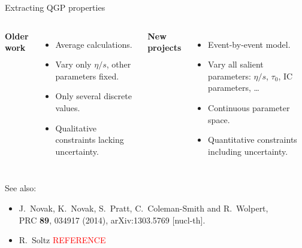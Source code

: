 \documentclass{beamer}
\begin{document}
\begin{frame}{Extracting QGP properties}
  \vspace{1em}
  \begin{columns}
    \begin{center}
      \bf Older work
    \end{center}
    \begin{itemize}
      \item Average calculations.
        \sms
      \item Vary only $\eta/s$, other parameters fixed.
        \sms
      \item Only several discrete values.
        \sms
      \item Qualitative constraints lacking uncertainty.
    \end{itemize}

    \begin{center}
      \bf New projects
    \end{center}
    \begin{itemize}
      \item Event-by-event model.
        \sms
      \item Vary all salient parameters:  $\eta/s$, $\tau_0$, IC parameters, \ldots
        \sms
      \item Continuous parameter space.
        \sms
      \item Quantitative constraints including uncertainty.
    \end{itemize}
  \end{columns}
  
  \vspace{2em}
  \scriptsize
  See also: \\
  \begin{itemize}
    \item J.~Novak, K.~Novak, S.~Pratt, C.~Coleman-Smith and R.~Wolpert, \\ PRC \textbf{89}, 034917 (2014), arXiv:1303.5769 [nucl-th].
    \item R.~Soltz \textcolor{red}{REFERENCE}
  \end{itemize}


\end{frame}
\end{document}
